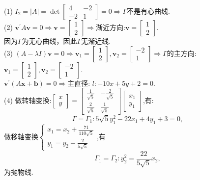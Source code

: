 \begin{solution}
    (1) $I_2=|A|=\det \begin{bmatrix}
        4 &-2\\
        -2 &1
    \end{bmatrix}=0 \Rightarrow \Gamma$不是有心曲线.\\
    (2) $\mathbf{v}^\prime A \mathbf{v}=0 \Rightarrow \mathbf{v}=\begin{bmatrix}
        1\\2
    \end{bmatrix}\Rightarrow $渐近方向:$\mathbf{v}=\begin{bmatrix}
        1\\2
    \end{bmatrix}$.\\
    因为$\Gamma$为无心曲线，因此$\Gamma$无渐近线.\\
    (3) $(A-\lambda I)\mathbf{v}=0 \Rightarrow \mathbf{v}_1=\begin{bmatrix}
        1\\ 2
    \end{bmatrix},\mathbf{v}_2=\begin{bmatrix}
        -2\\1
    \end{bmatrix} \Rightarrow \Gamma$的主方向:$\mathbf{v}_1=\begin{bmatrix}
        1\\2
    \end{bmatrix},\mathbf{v}_2=\begin{bmatrix}
        -2\\1
    \end{bmatrix}.$\\
    $\mathbf{v}^\prime(A\mathbf{x}+\mathbf{b})=0 \Rightarrow$主直径: $l :-10x+5y+2=0$.\\
    (4) 做转轴变换:$\begin{bmatrix}
        x\\y
    \end{bmatrix}=\begin{bmatrix}
        \frac{1}{\sqrt{5}} &-\frac{2}{\sqrt{5}}\\
        \frac{2}{\sqrt{5}} &\frac{1}{\sqrt{5}}
    \end{bmatrix} \begin{bmatrix}
        x_1\\y_1
    \end{bmatrix}$,有:
    \[\Gamma=\Gamma_1:5\sqrt{5}y_1^2-22x_1+4y_1+3=0,\]
    做移轴变换$\begin{cases}
        x_1=x_2+\frac{71}{110\sqrt{5}}\\
        y_1=y_2-\frac{2}{5\sqrt{5}}
    \end{cases}$,有
    \[\displaystyle \Gamma_1=\Gamma_2:y_2^2=\frac{22}{5\sqrt{5}}x_2,\]
    为抛物线.
\end{solution}

